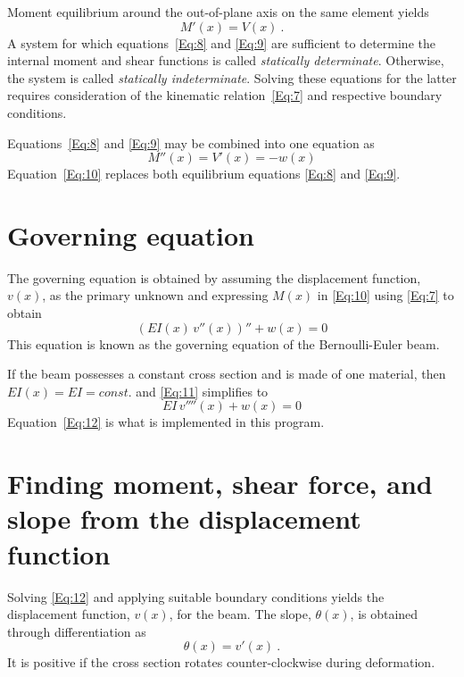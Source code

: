 \documentclass[11pt, oneside]{article}   	%
\begin{document}
Moment equilibrium around the out-of-plane axis on the same element yields
\begin{equation}
	M'(x) = V(x) ~.
	\label{Eq:9}
\end{equation}
A system for which equations~\eqref{Eq:8} and \eqref{Eq:9} are sufficient to determine the internal moment and shear functions is called \emph{statically determinate}. Otherwise, the system is called \emph{statically indeterminate}. Solving these equations for the latter requires consideration of the kinematic relation~\eqref{Eq:7} and respective boundary conditions.

Equations~\eqref{Eq:8} and \eqref{Eq:9} may be combined into one equation as
\begin{equation}
	M''(x) = V'(x)=-w(x)
	\label{Eq:10}
\end{equation}
Equation~\eqref{Eq:10} replaces both equilibrium equations \eqref{Eq:8} and \eqref{Eq:9}.

\section{Governing equation}
The governing equation is obtained by assuming the displacement function, $v(x)$, as the primary unknown and expressing $M(x)$ in \eqref{Eq:10} using \eqref{Eq:7} to obtain
\begin{equation}
	\left( EI(x)\,v''(x) \right)'' + w(x) = 0
	\label{Eq:11}
\end{equation}
This equation is known as the governing equation of the Bernoulli-Euler beam.

If the beam possesses a constant cross section and is made of one material, then $EI(x)=EI=const.$ and
\eqref{Eq:11} simplifies to
\begin{equation}
	EI\,v''''(x) + w(x) = 0
	\label{Eq:12}
\end{equation}
Equation~\eqref{Eq:12} is what is implemented in this program.

\section{Finding moment, shear force, and slope from the displacement function}
Solving \eqref{Eq:12} and applying suitable boundary conditions yields the displacement function, $v(x)$, for the beam.
The slope, $\theta(x)$, is obtained through differentiation as
\begin{equation}
	\theta(x) = v'(x) ~.
	\label{Eq:13}
\end{equation}
It is positive if the cross section rotates counter-clockwise during deformation.
\end{document}
